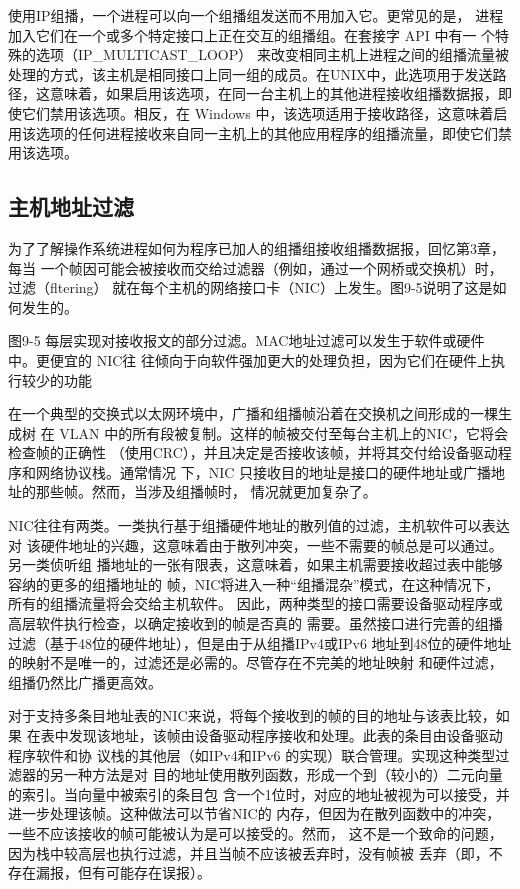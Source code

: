 \begin{tcolorbox}
  使用IP组播，一个进程可以向一个组播组发送而不用加入它。更常见的是，
  进程加入它们在一个或多个特定接口上正在交互的组播组。在套接字 API 中有一
  个特殊的选项（IP\_MULTICAST\_LOOP） 来改变相同主机上进程之间的组播流量被
  处理的方式，该主机是相同接口上同一组的成员。在UNIX中，此选项用于发送路
  径，这意味着，如果启用该选项，在同一台主机上的其他进程接收组播数据报，即
  使它们禁用该选项。相反，在 Windows 中，该选项适用于接收路径，这意味着启
  用该选项的任何进程接收来自同一主机上的其他应用程序的组播流量，即使它们禁
  用该选项。
\end{tcolorbox}

\subsection{主机地址过滤}
为了了解操作系统进程如何为程序已加人的组播组接收组播数据报，回忆第3章，每当
一个帧因可能会被接收而交给过滤器（例如，通过一个网桥或交换机）时，过滤（fltering）
就在每个主机的网络接口卡（NIC）上发生。图9-5说明了这是如何发生的。

图9-5 每层实现对接收报文的部分过滤。MAC地址过滤可以发生于软件或硬件中。更便宜的 NIC往
往倾向于向软件强加更大的处理负担，因为它们在硬件上执行较少的功能

在一个典型的交换式以太网环境中，广播和组播帧沿着在交换机之间形成的一棵生成树
在 VLAN 中的所有段被复制。这样的帧被交付至每台主机上的NIC，它将会检查帧的正确性
（使用CRC），并且决定是否接收该帧，并将其交付给设备驱动程序和网络协议栈。通常情况
下，NIC 只接收目的地址是接口的硬件地址或广播地址的那些帧。然而，当涉及组播帧时，
情况就更加复杂了。

NIC往往有两类。一类执行基于组播硬件地址的散列值的过滤，主机软件可以表达对
该硬件地址的兴趣，这意味着由于散列冲突，一些不需要的帧总是可以通过。另一类侦听组
播地址的一张有限表，这意味着，如果主机需要接收超过表中能够容纳的更多的组播地址的
帧，NIC将进入一种“组播混杂”模式，在这种情况下，所有的组播流量将会交给主机软件。
因此，两种类型的接口需要设备驱动程序或高层软件执行检查，以确定接收到的帧是否真的
需要。虽然接口进行完善的组播过滤（基于48位的硬件地址），但是由于从组播IPv4或IPv6
地址到48位的硬件地址的映射不是唯一的，过滤还是必需的。尽管存在不完美的地址映射
和硬件过滤，组播仍然比广播更高效。

对于支持多条目地址表的NIC来说，将每个接收到的帧的目的地址与该表比较，如果
在表中发现该地址，该帧由设备驱动程序接收和处理。此表的条目由设备驱动程序软件和协
议栈的其他层（如IPv4和IPv6 的实现）联合管理。实现这种类型过滤器的另一种方法是对
目的地址使用散列函数，形成一个到（较小的）二元向量的索引。当向量中被索引的条目包
含一个1位时，对应的地址被视为可以接受，并进一步处理该帧。这种做法可以节省NIC的
内存，但因为在散列函数中的冲突，一些不应该接收的帧可能被认为是可以接受的。然而，
这不是一个致命的问题，因为栈中较高层也执行过滤，并且当帧不应该被丢弃时，没有帧被
丢弃（即，不存在漏报，但有可能存在误报）。

